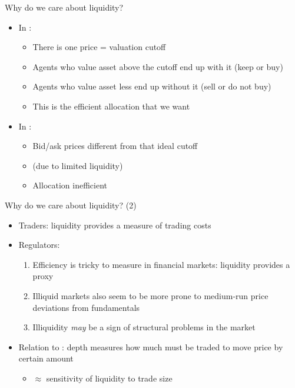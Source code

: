 \documentclass[english,10pt
,aspectratio=169
]{beamer}
\begin{document}
\begin{frame}{Why do we care about liquidity?}
	\begin{itemize}
		\item In :
		\begin{itemize}
			\item There is one price = valuation cutoff
			\item Agents who value asset above the cutoff end up with it (keep or buy)
			\item Agents who value asset less end up without it (sell or do not buy)
			\item This is the \alert{efficient} allocation that we want
		\end{itemize}
	\pause
		\item In :
		\begin{itemize}
			\item Bid/ask prices different from that ideal cutoff
			\item (due to limited liquidity)
			\item Allocation \alert{inefficient}
		\end{itemize}
	\end{itemize}
\end{frame}


\begin{frame}{Why do we care about liquidity? (2)}
\begin{itemize}
	\item Traders: liquidity provides a measure of trading costs
	\item Regulators:
	\begin{enumerate}
		\item Efficiency is tricky to measure in financial markets: liquidity provides a proxy
		\item Illiquid markets also seem to be more prone to medium-run price deviations from fundamentals
		\item Illiquidity \textit{may} be a sign of structural problems in the market
	\end{enumerate}
	\item Relation to : depth measures how much must be traded to move price by certain amount
	\begin{itemize}
		\item $\approx$ sensitivity of liquidity to trade size
	\end{itemize}
\end{itemize}
\end{frame}
\end{document}

